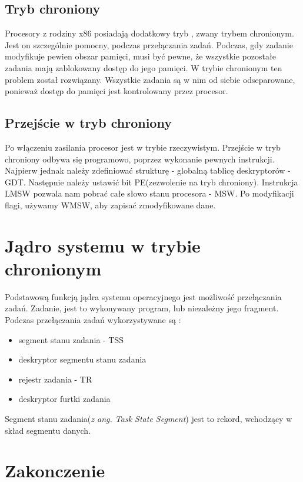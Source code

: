 \documentclass[a4paper,12pt]{article}
\begin{document}
	
	
	\subsection{Tryb chroniony}
	Procesory z rodziny x86  posiadają dodatkowy tryb , zwany trybem chronionym. Jest on szczególnie pomocny, podczas przełączania zadań. Podczas, gdy zadanie modyfikuje pewien obszar pamięci, musi być pewne, że wszystkie pozostałe zadania mają zablokowany dostęp do jego pamięci. W trybie chronionym ten problem został rozwiązany. Wszystkie zadania są w nim od siebie odseparowane, ponieważ dostęp do pamięci jest kontrolowany przez procesor. 

	\subsection{Przejście w tryb chroniony}
	Po włączeniu zasilania procesor jest w trybie rzeczywistym. Przejście w tryb chroniony odbywa się programowo, poprzez wykonanie pewnych instrukcji. Najpierw jednak należy zdefiniować strukturę - globalną tablicę deskryptorów - GDT.  Następnie należy ustawić bit PE(zezwolenie na tryb chroniony). Instrukcja LMSW pozwala nam pobrać całe słowo stanu procesora -  MSW. Po modyfikacji flagi, używamy WMSW, aby zapisać zmodyfikowane dane.
	
	\section{Jądro systemu w trybie chronionym}
	
	Podstawową funkcją jądra systemu operacyjnego jest możliwość przełączania zadań. Zadanie, jest to wykonywany program, lub niezależny jego fragment. Podczas przełączania zadań wykorzystywane są :
	\begin{itemize}
	\item{segment stanu zadania - TSS}
	\item{deskryptor segmentu stanu zadania}
	\item{rejestr zadania - TR}
	\item{deskryptor furtki zadania}
	\end{itemize}
Segment stanu zadania(\textit{z ang. Task State Segment}) jest to rekord, wchodzący w skład segmentu danych. 
	\section{Zakonczenie}

	
\end{document}
